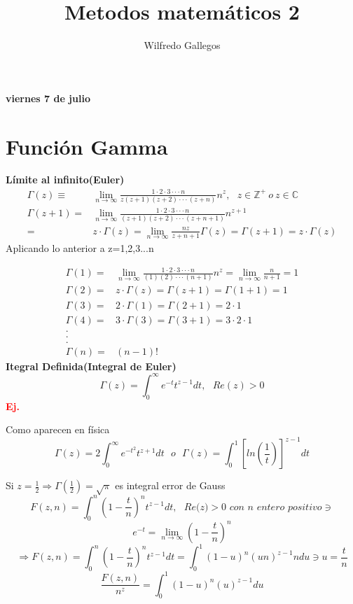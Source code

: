 \documentclass{article}
\title{Metodos matemáticos 2}
\author{Wilfredo Gallegos}
\theoremstyle{definition}
\begin{document}
\maketitle

\textbf{viernes 7 de julio}
\section{Función Gamma}
\textbf{Límite al infinito(Euler)}\\

\[\begin{array}{rl}
	\Gamma (z)\equiv & \lim\limits_{n\to \infty} \frac{1\cdot 2\cdot 3\cdot\cdot\cdot n}{z(z+1)(z+2)\cdot\cdot\cdot (z+n)}n^z,\ \ \ z\in\mathbb{Z}^{+}\ o\ z\in\mathbb{C}\\
	\Gamma(z+1)=& \lim\limits_{n\to \infty} \frac{1\cdot 2\cdot 3\cdot\cdot\cdot n}{(z+1)(z+2)\cdot\cdot\cdot (z+n+1)}n^{z+1}\\
	=& z\cdot\Gamma (z)= \lim\limits_{n\to \infty}\frac{nz}{z+n+1}\Gamma (z)=\Gamma (z+1)=z\cdot\Gamma (z)
\end{array}\]
Aplicando lo anterior a z=1,2,3...n

\[\begin{array}{rl}

	\Gamma (1)=& \lim\limits_{n\to \infty} \frac{1\cdot 2\cdot 3\cdot\cdot\cdot n}{(1)(2)\cdot\cdot\cdot (n+1)}n^z= \lim\limits_{n\to \infty}\frac{n}{n+1}=1\\
	\Gamma (2)=& z\cdot \Gamma (z)= \Gamma (z+1)=\Gamma (1+1)=1\\
	\Gamma (3)=& 2\cdot \Gamma (1)= \Gamma (2+1)=2\cdot 1\\
	\Gamma (4)=& 3\cdot \Gamma (3)= \Gamma (3+1)=3\cdot 2\cdot 1\\
	.\\
	.\\
	.\\
	\Gamma (n)=&(n-1)!

\end{array}\]
\textbf{Itegral Definida(Integral de Euler)}
\[\Gamma (z)=\int^{\infty}_0 e^{-t}t^{z-1}dt,\ \ \ Re(z)>0\]
\textbf{\textcolor{red}{Ej.}} 

Como aparecen en física
\[\Gamma (z)= 2\int^{\infty}_0 e^{-t^2}t^{z+1}dt\ \ \ o \ \ \ \Gamma (z) = \int^1_0\left[ln(\frac{1}{t})\right]^{z-1}dt\]

Si $z=\frac{1}{2}\Rightarrow \Gamma (\frac{1}{2}) = \sqrt{\pi}$ es integral error de Gauss
\[F(z,n)=\int^n_0\left(1-\frac{t}{n}\right)^nt^{z-1}dt,\ \ \ \textit{Re(z)}>\textit{0 con n entero positivo}\ni\]
\[e^{-t}=\lim\limits_{n\to \infty}\left(1-\frac{t}{n}\right)^n\]
\[\Rightarrow F(z,n)=\int^n_0\left(1-\frac{t}{n}\right)^nt^{z-1}dt = \int^1_0 (1-u)^n(un)^{z-1}ndu\ni u=\frac{t}{n}\]
\[\frac{F(z,n)}{n^z}=\int^1_0 (1-u)^n(u)^{z-1}du\]\\
\end{document}
